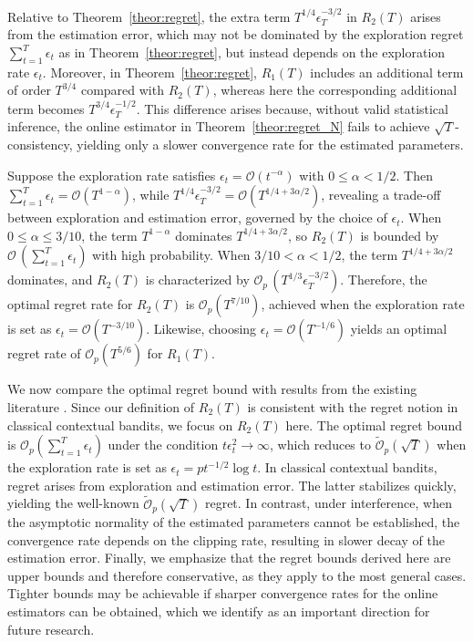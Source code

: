 \documentclass[12pt]{article}
\begin{document}
Relative to Theorem~\ref{theor:regret}, the extra term $T^{1/4} \epsilon_T^{-3/2}$ in $R_2(T)$ arises from the estimation error, which may not be dominated by the exploration regret $\sum_{t=1}^T \epsilon_t$ as in Theorem~\ref{theor:regret}, but instead depends on the exploration rate $\epsilon_t$. Moreover, in Theorem~\ref{theor:regret}, $R_1(T)$ includes an additional term of order $T^{3/4}$ compared with $R_2(T)$, whereas here the corresponding additional term becomes $T^{3/4} \epsilon_T^{-1/2}$. This difference arises because, without valid statistical inference, the online estimator in Theorem~\ref{theor:regret_N} fails to achieve $\sqrt{T}$-consistency, yielding only a slower convergence rate for the estimated parameters.

Suppose the exploration rate satisfies $\epsilon_t = \mathcal{O}(t^{-\alpha})$ with $0 \le \alpha < 1/2$. Then $\sum_{t=1}^T \epsilon_t = \mathcal{O}(T^{1-\alpha})$, while $T^{1/4} \epsilon_T^{-3/2} = \mathcal{O}(T^{1/4+3\alpha/2})$, revealing a trade-off between exploration and estimation error, governed by the choice of $\epsilon_t$.
When $0 \le \alpha \le 3/10$, the term $T^{1-\alpha}$ dominates $T^{1/4+3\alpha/2}$, so $R_2(T)$ is bounded by $\mathcal{O}\,(\sum_{t=1}^T \epsilon_t)$ with high probability.
When $3/10 < \alpha < 1/2$, the term $T^{1/4+3\alpha/2}$ dominates, and $R_2(T)$ is characterized by $\mathcal{O}_p \, (T^{1/3} \epsilon_T^{-3/2})$.  
Therefore, the optimal regret rate for $R_2(T)$ is $\mathcal{O}_p(T^{7/10})$, achieved when the exploration rate is set as $\epsilon_t = \mathcal{O}(T^{-3/10})$. Likewise, choosing $\epsilon_t = \mathcal{O}(T^{-1/6})$ yields an optimal regret rate of $\mathcal{O}_p(T^{5/6})$ for $R_1(T)$.


We now compare the optimal regret bound with results from the existing literature \citep[see, e.g.,][]{chen2021,xu2024}. Since our definition of $R_2(T)$ is consistent with the regret notion in classical contextual bandits, we focus on $R_2(T)$ here. The optimal regret bound is $\mathcal{O}_p(\sum_{t=1}^T \epsilon_t)$ under the condition $t \epsilon_t^2 \to \infty$, which reduces to $\widetilde{\mathcal{O}}_p(\sqrt{T})$ when the exploration rate is set as $\epsilon_t = p t^{-1/2} \log t$. 
In classical contextual bandits, regret arises from exploration and estimation error. The latter stabilizes quickly, yielding the well-known $\widetilde{\mathcal{O}}_p(\sqrt{T})$ regret.
In contrast, under interference, when the asymptotic normality of the estimated parameters cannot be established, the convergence rate depends on the clipping rate, resulting in slower decay of the estimation error.
Finally, we emphasize that the regret bounds derived here are upper bounds and therefore conservative, as they apply to the most general cases. Tighter bounds may be achievable if sharper convergence rates for the online estimators can be obtained, which we identify as an important direction for future research.
\end{document}
